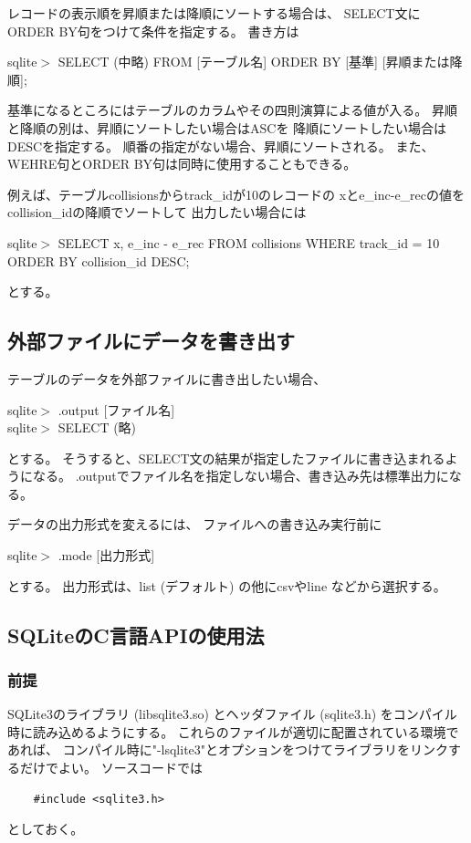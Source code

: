 \documentclass [11pt,a4paper,dvipdfmx] {jarticle}
\begin{document}
レコードの表示順を昇順または降順にソートする場合は、
SELECT文にORDER BY句をつけて条件を指定する。
書き方は
\begin{screen}[4]
    sqlite$>$ SELECT (中略) FROM [テーブル名] ORDER BY [基準] [昇順または降順];
\end{screen}
基準になるところにはテーブルのカラムやその四則演算による値が入る。
昇順と降順の別は、昇順にソートしたい場合はASCを
降順にソートしたい場合はDESCを指定する。
順番の指定がない場合、昇順にソートされる。
また、WEHRE句とORDER BY句は同時に使用することもできる。

例えば、テーブルcollisionsからtrack\_idが10のレコードの
xとe\_inc-e\_recの値を
collision\_idの降順でソートして
出力したい場合には
\begin{screen}[4]
    sqlite$>$ SELECT x, e\_inc - e\_rec FROM collisions WHERE track\_id = 10\\ 
    ORDER BY collision\_id DESC;
\end{screen}
とする。

\subsection{外部ファイルにデータを書き出す}
テーブルのデータを外部ファイルに書き出したい場合、
\begin{screen}[4]
    sqlite$>$ .output [ファイル名]　\\
    sqlite$>$  SELECT (略)
\end{screen}
とする。
そうすると、SELECT文の結果が指定したファイルに書き込まれるようになる。
.outputでファイル名を指定しない場合、書き込み先は標準出力になる。

データの出力形式を変えるには、
ファイルへの書き込み実行前に
\begin{screen}[4]
    sqlite$>$ .mode [出力形式]
\end{screen}
とする。
出力形式は、list (デフォルト) の他にcsvやline
などから選択する。

\subsection{SQLiteのC言語APIの使用法}

\subsubsection{前提}
SQLite3のライブラリ (libsqlite3.so) とヘッダファイル (sqlite3.h)
をコンパイル時に読み込めるようにする。
これらのファイルが適切に配置されている環境であれば、
コンパイル時に"-lsqlite3"とオプションをつけてライブラリをリンクするだけでよい。
ソースコードでは
\begin{lstlisting}
    #include <sqlite3.h>
\end{lstlisting}
としておく。
\end{document}
